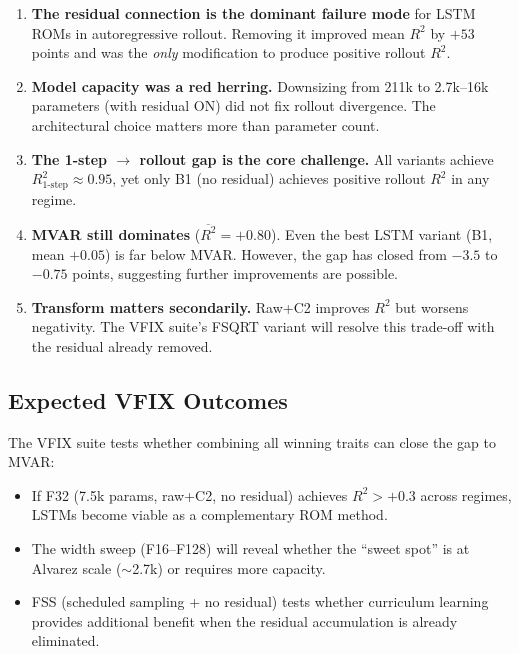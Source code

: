 \documentclass[11pt,letterpaper]{article}
\newcommand{\Rtwo}{R^2}
\begin{document}
\begin{enumerate}
  \item \textbf{The residual connection is the dominant failure mode} for LSTM ROMs
        in autoregressive rollout.  Removing it improved mean $\Rtwo$ by $+53$ points
        and was the \emph{only} modification to produce positive rollout $\Rtwo$.

  \item \textbf{Model capacity was a red herring.}  Downsizing from 211k to 2.7k--16k
        parameters (with residual ON) did not fix rollout divergence. The architectural
        choice matters more than parameter count.

  \item \textbf{The 1-step $\to$ rollout gap is the core challenge.}  All variants achieve
        $\Rtwo_\text{1-step} \approx 0.95$, yet only B1 (no residual) achieves positive
        rollout $\Rtwo$ in any regime.

  \item \textbf{MVAR still dominates} ($\overline{\Rtwo}=+0.80$).  Even the best LSTM
        variant (B1, mean $+0.05$) is far below MVAR.  However, the gap has closed from
        $-3.5$ to $-0.75$ points, suggesting further improvements are possible.

  \item \textbf{Transform matters secondarily.}  Raw+C2 improves $\Rtwo$ but worsens
        negativity.  The VFIX suite's FSQRT variant will resolve this trade-off with
        the residual already removed.
\end{enumerate}

\subsection{Expected VFIX Outcomes}

The VFIX suite tests whether combining all winning traits can close the gap to MVAR:
\begin{itemize}[nosep]
  \item If F32 (7.5k params, raw+C2, no residual) achieves $\Rtwo > +0.3$ across regimes,
        LSTMs become viable as a complementary ROM method.
  \item The width sweep (F16--F128) will reveal whether the ``sweet spot'' is at 
        Alvarez scale ($\sim$2.7k) or requires more capacity.
  \item FSS (scheduled sampling + no residual) tests whether curriculum learning
        provides additional benefit when the residual accumulation is already eliminated.
\end{itemize}
\end{document}
